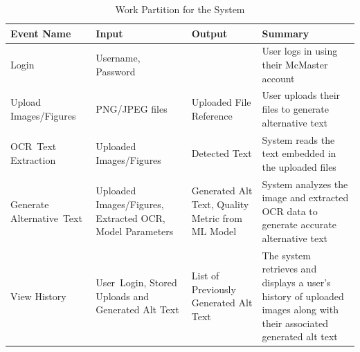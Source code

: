 \documentclass[12pt]{article}
\begin{document}
\begin{table}[H]
  \centering
  \caption{Work Partition for the System}
  \label{tab:work-partition}
  \begin{tabular}{ |p{3cm}|p{3cm}|p{3cm}|p{4cm}| }
    \hline
    \textbf{Event Name} & \textbf{Input} & \textbf{Output} & \textbf{Summary} \\
    \hline
    Login & Username, Password & & User logs in using their McMaster account \\
    \hline
    Upload  \mbox{Images/Figures} & PNG/JPEG files & Uploaded File Reference & User uploads their files to generate alternative text \\
    \hline
    \mbox{OCR Text} \mbox{Extraction} & Uploaded \mbox{Images/Figures} & Detected Text & System reads the text embedded in the uploaded files \\
    \hline
    Generate \mbox{Alternative Text} & Uploaded  \mbox{Images/Figures}, Extracted OCR, Model Parameters & Generated Alt Text, Quality Metric from ML Model & System analyzes the image and extracted OCR data to generate accurate alternative text \\
    \hline
    View History & \mbox{User Login,} Stored Uploads and Generated Alt Text & List of Previously Generated Alt Text & The system retrieves and displays a user’s history of uploaded images along with their associated generated alt text \\
    \hline
  \end{tabular}
\end{table}
\end{document}
